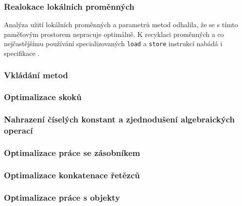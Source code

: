 \subsubsection{Realokace lokálních proměnných}
Analýza užití lokálních proměnných a parametrů metod odhalila, že se s tímto paměťovým prostorem nepracuje optimálně. K recyklaci proměnných a co nejčastějšímu používání specializovaných \texttt{load} a \texttt{store} instrukcí nabádá i specifikace \cite{Lindholm:JVM}.

\subsubsection{Vkládání metod}

\subsubsection{Optimalizace skoků}


\subsubsection{Nahrazení číselých konstant a zjednodušení algebraických operací}

\subsubsection{Optimalizace práce se zásobníkem}

\subsubsection{Optimalizace konkatenace řetězců}


\subsubsection{Optimalizace práce s objekty}


